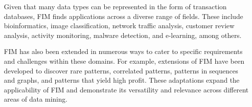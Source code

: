 Given that many data types can be represented in the form of transaction databases, FIM finds applications across a diverse range of fields. These include bioinformatics, image classification, network traffic analysis, customer review analysis, activity monitoring, malware detection, and e-learning, among others.

FIM has also been extended in numerous ways to cater to specific requirements and challenges within these domains. For example, extensions of FIM have been developed to discover rare patterns, correlated patterns, patterns in sequences and graphs, and patterns that yield high profit. These adaptations expand the applicability of FIM and demonstrate its versatility and relevance across different areas of data mining.
